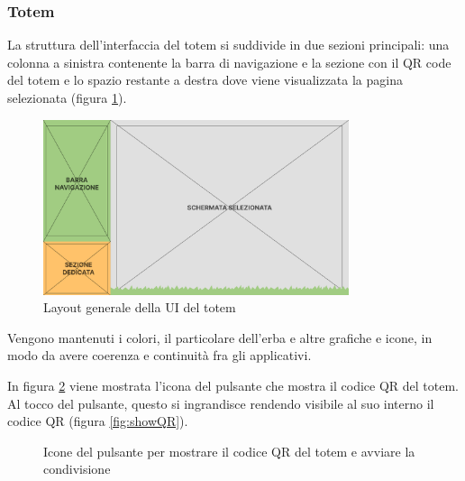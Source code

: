 \subsubsection{Totem}
\label{subsec:totem}
La struttura dell'interfaccia del totem si suddivide in due sezioni principali: una colonna a sinistra contenente la barra di navigazione e la sezione con il QR code del totem e lo spazio restante a destra dove viene visualizzata la pagina selezionata (figura \ref{fig:viewStruct}).
\begin{figure}[h]
    \centering
    \includegraphics[width=0.8\textwidth]{img/totem/mainStructure.png}
    \caption{Layout generale della UI del totem}
    \label{fig:viewStruct}
\end{figure}

Vengono mantenuti i colori, il particolare dell'erba e altre grafiche e icone, in modo da avere coerenza e continuità fra gli applicativi.

In figura \ref{fig:depositIconsQR} viene mostrata l'icona del pulsante che mostra il codice QR del totem. Al tocco del pulsante, questo si ingrandisce rendendo visibile al suo interno il codice QR (figura \ref{fig:showQR}).
\begin{figure}
    \centering
    \vspace{1cm}
    \caption[Icone del QR code nel totem]{Icone del pulsante per mostrare il codice QR del totem e avviare la condivisione}
    \label{fig:depositIconsQR}
\end{figure}


